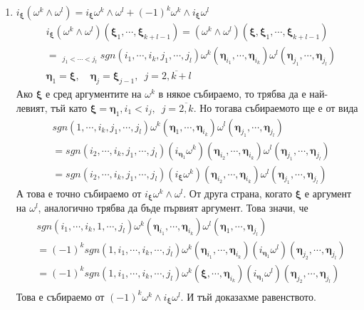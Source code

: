 \documentclass[12pt]{article}
\newcommand\myxi[0]{\boldsymbol{\xi}}
\newcommand\myeta[0]{\boldsymbol{\eta}}
\begin{document}
\begin{large}
\begin{enumerate}
  \item $i_{\myxi}(\omega^k \wedge \omega^l)=i_{\myxi}\omega^k \wedge \omega^l + (-1)^k \omega^k \wedge i_{\myxi}\omega^l$
  \begin{align*}
    &i_{\myxi}(\omega^k \wedge \omega^l)(\myxi_1,\cdots,\myxi_{k+l-1})
    =(\omega^k \wedge \omega^l)(\myxi,\myxi_1,\cdots,\myxi_{k+l-1}) \\
    &=\mathop{\sum_{i_1<\cdots<i_k}}_{j_1<\cdots<j_l} sgn(i_1,\cdots,i_k,j_1, \cdots,j_l)\omega^k(\myeta_{i_1},\cdots,\myeta_{i_k})\omega^l(\myeta_{j_1},\cdots,\myeta_{j_l}) \\
    &\myeta_1=\myxi, \quad \myeta_j=\myxi_{j-1}, \enspace j=\overline{2,k+l}
  \end{align*}
  Ако $\myxi$ е сред аргументите на $\omega^k$ в някое събираемо, то трябва да е най-левият, тъй като $\myxi=\myeta_1, i_1<i_j, \enspace j=\overline{2,k}$. Но тогава събираемото ще е от вида
  \begin{align*}
    &sgn(1,\cdots,i_k,j_1, \cdots,j_l)\omega^k(\myeta_1,\cdots,\myeta_{i_k})\omega^l(\myeta_{j_1},\cdots,\myeta_{j_l}) \\
    &=sgn(i_2,\cdots,i_k,j_1, \cdots,j_l) (i_{\myeta_1}\omega^k)(\myeta_{i_2},\cdots,\myeta_{i_k})\omega^l(\myeta_{j_1},\cdots,\myeta_{j_l}) \\
    &=sgn(i_2,\cdots,i_k,j_1, \cdots,j_l) (i_{\myxi}\omega^k)(\myeta_{i_2},\cdots,\myeta_{i_k})\omega^l(\myeta_{j_1},\cdots,\myeta_{j_l})
  \end{align*}
  А това е точно събираемо от $i_{\myxi}\omega^k \wedge \omega^l$. От друга страна, когато $\myxi$ е аргумент на $\omega^l$, аналогично трябва да бъде първият аргумент. Това значи, че
  \begin{align*}
    &sgn(i_1,\cdots,i_k,1, \cdots,j_l)\omega^k(\myeta_{i_1},\cdots,\myeta_{i_k})\omega^l(\myeta_1,\cdots,\myeta_{j_l}) \\
    &=(-1)^k sgn(1,i_1,\cdots,i_k, \cdots,j_l) \omega^k(\myeta_{i_1},\cdots,\myeta_{i_k})(i_{\myeta_1}\omega^l)(\myeta_{j_2},\cdots,\myeta_{j_l}) \\
    &=(-1)^k sgn(1,i_1,\cdots,i_k, \cdots,j_l) \omega^k(\myxi,\cdots,\myeta_{i_k})(i_{\myeta_1}\omega^l)(\myeta_{j_2},\cdots,\myeta_{j_l}) \\
  \end{align*}
  Това е събираемо от $(-1)^k \omega^k \wedge i_{\myxi}\omega^l$. И тъй доказахме равенството.
\end{enumerate}


\end{large}
\end{document}
